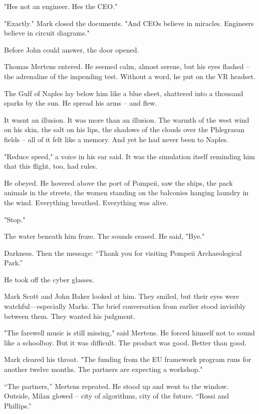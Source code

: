 \documentclass[
]{article}
\begin{document}
"He\textquotesingle s not an engineer. He\textquotesingle s the CEO."

"Exactly." Mark closed the documents. "And CEOs believe in miracles. Engineers believe in circuit diagrams."

Before John could answer, the door opened.

Thomas Mertens entered. He seemed calm, almost serene, but his eyes flashed -- the adrenaline of the impending test. Without a word, he put on the VR headset.

The Gulf of Naples lay below him like a blue sheet, shattered into a thousand sparks by the sun. He spread his arms -- and flew.

It wasn\textquotesingle t an illusion. It was more than an illusion. The warmth of the west wind on his skin, the salt on his lips, the shadows of the clouds over the Phlegraean fields -- all of it felt like a memory. And yet he had never been to Naples.

"Reduce speed," a voice in his ear said. It was the simulation itself reminding him that this flight, too, had rules.

He obeyed. He hovered above the port of Pompeii, saw the ships, the pack animals in the streets, the women standing on the balconies hanging laundry in the wind. Everything breathed. Everything was alive.

"Stop."

The water beneath him froze. The sounds ceased. He said, "Bye."

Darkness. Then the message: ``Thank you for visiting Pompeii Archaeological Park.''

He took off the cyber glasses.

Mark Scott and John Baker looked at him. They smiled, but their eyes were watchful---especially Mark\textquotesingle s. The brief conversation from earlier stood invisibly between them. They wanted his judgment.

"The farewell music is still missing," said Mertens. He forced himself not to sound like a schoolboy. But it was difficult. The product was good. Better than good.

Mark cleared his throat. "The funding from the EU framework program runs for another twelve months. The partners are expecting a workshop."

``The partners,'' Mertens repeated. He stood up and went to the window. Outside, Milan glowed -- city of algorithms, city of the future. ``Rossi and Phillips.''
\end{document}
